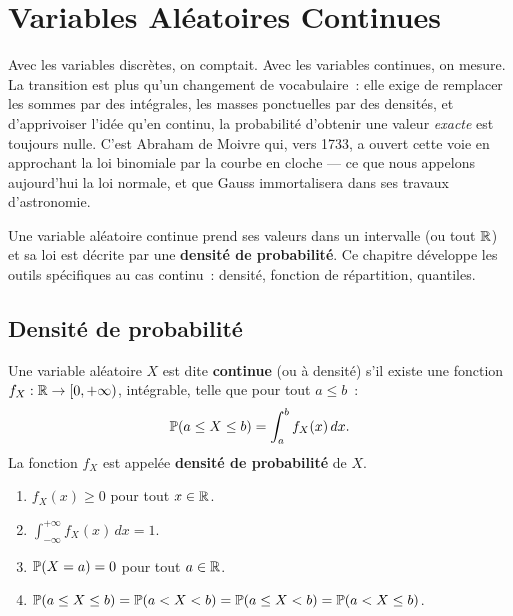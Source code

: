 \chapter{Variables Al\'eatoires Continues}
\label{ch:continues}

Avec les variables discr\`etes, on comptait. Avec les variables continues, on mesure. La transition est plus qu'un changement de vocabulaire~: elle exige de remplacer les sommes par des int\'egrales, les masses ponctuelles par des densit\'es, et d'apprivoiser l'id\'ee qu'en continu, la probabilit\'e d'obtenir une valeur \emph{exacte} est toujours nulle. C'est Abraham de Moivre qui, vers 1733, a ouvert cette voie en approchant la loi binomiale par la courbe en cloche --- ce que nous appelons aujourd'hui la loi normale, et que Gauss immortalisera dans ses travaux d'astronomie.

\begin{intuition}
Une variable al\'eatoire continue prend ses valeurs dans un intervalle (ou tout
$\mathbb{R}$) et sa loi est d\'ecrite par une \textbf{densit\'e de probabilit\'e}. Ce
chapitre d\'eveloppe les outils sp\'ecifiques au cas continu~: densit\'e, fonction
de r\'epartition, quantiles.
\end{intuition}

\section{Densit\'e de probabilit\'e}

\begin{definition}
Une variable al\'eatoire $X$ est dite \textbf{continue} (ou \`a densit\'e) s'il
existe une fonction $f_X : \mathbb{R} \to [0, +\infty)$, int\'egrable, telle que pour tout
$a \leq b$~:
\[
    \mathbb{P}(a \leq X \leq b) = \int_a^b f_X(x)\, dx.
\]
La fonction $f_X$ est appel\'ee \textbf{densit\'e de probabilit\'e} de $X$.
\end{definition}

\begin{proposition}
\begin{enumerate}[label=(\roman*)]
    \item $f_X(x) \geq 0$ pour tout $x \in \mathbb{R}$.
    \item $\int_{-\infty}^{+\infty} f_X(x)\, dx = 1$.
    \item $\mathbb{P}(X = a) = 0$ pour tout $a \in \mathbb{R}$.
    \item $\mathbb{P}(a \leq X \leq b) = \mathbb{P}(a < X < b) = \mathbb{P}(a \leq X < b) = \mathbb{P}(a < X \leq b)$.
\end{enumerate}
\end{proposition}

